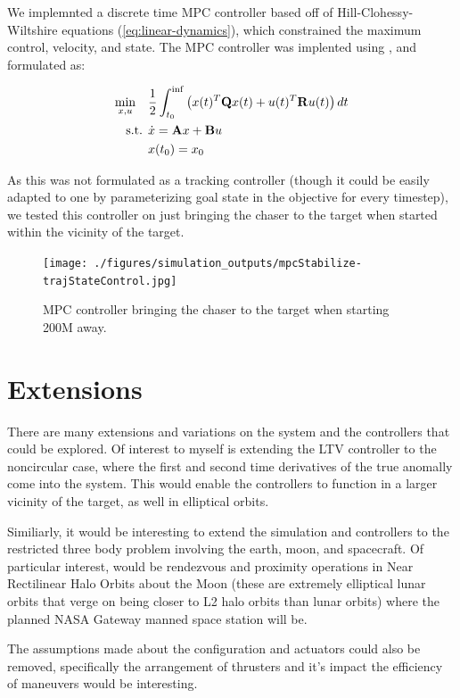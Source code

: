 \documentclass[conference]{IEEEtran}
\begin{document}
We implemnted a discrete time MPC controller based off of Hill-Clohessy-Wiltshire equations
(\ref{eq:linear-dynamics}), which constrained the maximum control, velocity,
and state. The MPC controller was implented using \cite{cppmpc_repo}, and formulated
as:

\begin{equation}
    \label{eq:mpc}
    \begin{split}
        \min_{x, u} \ \ \  & \frac{1}{2} \int_{t_0}^{\inf} \left( x(t)^T {\bf Q}
            x(t) + u(t)^T {\bf R} u(t) \right)dt \\
        \text{s.t.   } & \dot{x} = {\bf{A}}x + {\bf B}u \\
                     & x(t_0) = x_0
    \end{split}
\end{equation}

As this was not formulated as a tracking controller (though it could be easily
adapted to one by parameterizing goal state in the objective for every
timestep), we tested this controller on just bringing the chaser to the target
when started within the vicinity of the target.

\begin{figure}[t]
    \centerline{\texttt{[image: ./figures/simulation\_outputs/mpcStabilize-trajStateControl.jpg]}}
    \caption{MPC controller bringing the chaser to the target when starting
    200M away.}
    \label{fig:mpc}
\end{figure}


\section{Extensions}

There are many extensions and variations on the system and the controllers that
could be explored. Of interest to myself is extending the LTV
controller to the noncircular case, where the first and second time derivatives
of the true anomally come into the system. This would enable the controllers to
function in a larger vicinity of the target, as well in elliptical orbits.

Similiarly, it would be interesting to extend the simulation and controllers to
the restricted three body problem involving the earth, moon, and spacecraft. Of
particular interest, would be rendezvous and proximity operations in Near
Rectilinear Halo Orbits about the Moon (these are extremely elliptical lunar
orbits that verge on being closer to L2 halo orbits than lunar orbits) where
the planned NASA Gateway manned space station will be.

The assumptions made about the configuration and actuators could also be
removed, specifically the arrangement of thrusters and it's impact the
efficiency of maneuvers would be interesting.



\end{document}
